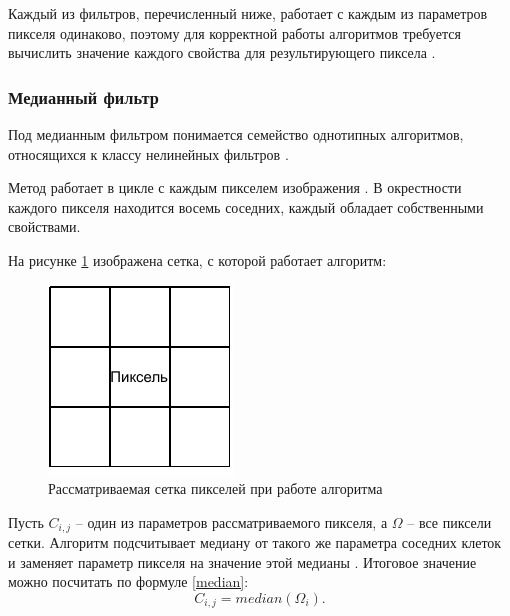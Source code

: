 Каждый из фильтров, перечисленный ниже, работает с каждым из параметров пикселя одинаково, поэтому для корректной работы алгоритмов требуется вычислить значение каждого свойства для результирующего пиксела \cite{filterTechincs}.

\newpage
\subsubsection{Медианный фильтр}
Под медианным фильтром понимается семейство однотипных алгоритмов, относящихся к классу нелинейных фильтров \cite{median}.

Метод работает в цикле с каждым пикселем изображения \cite{filterTechincs}. 
В окрестности каждого пикселя находится восемь соседних, каждый обладает собственными свойствами. 

На рисунке \ref{fig::grid} изображена сетка, с которой работает алгоритм:

\FloatBarrier
\begin{figure}[h]	
	\begin{center}
		\includegraphics[]{inc/pdf/grid.pdf}
	\end{center}
	\captionsetup{justification=centering}
	\caption{Рассматриваемая сетка пикселей при работе алгоритма}
	\label{fig::grid}
\end{figure}
\FloatBarrier

Пусть $C_{i, j}$ -- один из параметров рассматриваемого пикселя, а $\Omega$ -- все пиксели сетки.
Алгоритм подсчитывает медиану от такого же параметра соседних клеток и заменяет параметр пикселя на значение этой медианы \cite{median}.
Итоговое значение можно посчитать по формуле \eqref{median}: 
\begin{equation}
	\label{median}
	C_{i, j} = median(\Omega_i).
\end{equation}

